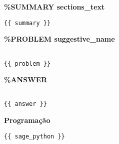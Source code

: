 



\noindent\textbf{\%SUMMARY {{sections_text}} }

\begin{verbatim}
{{ summary }}
\end{verbatim}

\noindent\textbf{\%PROBLEM {{suggestive_name}} }

\begin{verbatim}

{{ problem }}

\end{verbatim}

\noindent\textbf{\%ANSWER}

\begin{verbatim}

{{ answer }}

\end{verbatim}


\noindent\textbf{Programação}


\begin{lstlisting}
{{ sage_python }}
\end{lstlisting}






